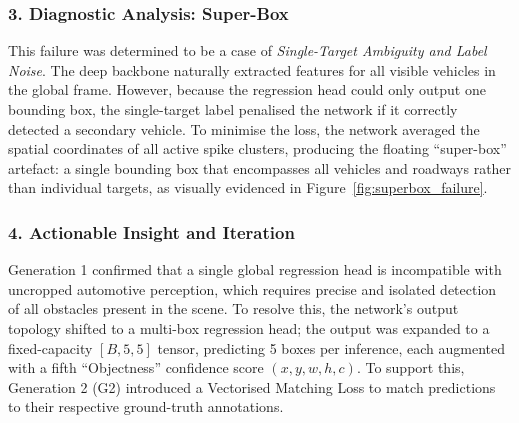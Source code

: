 \subsubsection*{3. Diagnostic Analysis: Super-Box}
This failure was determined to be a case of \textit{Single-Target Ambiguity and Label Noise}.
The deep backbone naturally extracted features for all visible vehicles in the global frame.
However, because the regression head could only output one bounding box,
the single-target label penalised the network if it correctly detected a secondary vehicle.
To minimise the loss, the network averaged the spatial coordinates of all active spike clusters, producing the floating ``super-box'' artefact:
a single bounding box that encompasses all vehicles and roadways rather than individual targets, as visually evidenced in
Figure~\ref{fig:superbox_failure}.

\subsubsection*{4. Actionable Insight and Iteration}
Generation 1 confirmed that a single global regression head is incompatible with uncropped automotive perception, which requires precise and isolated detection of all obstacles present in the scene.
To resolve this, the network's output topology shifted to a multi-box regression head;
the output was expanded to a fixed-capacity $[B, 5, 5]$ tensor, predicting 5 boxes per inference,
each augmented with a fifth ``Objectness'' confidence score $(x, y, w, h, c)$.
%
To support this, Generation 2 (G2) introduced a Vectorised Matching Loss to match predictions to their respective ground-truth annotations.

